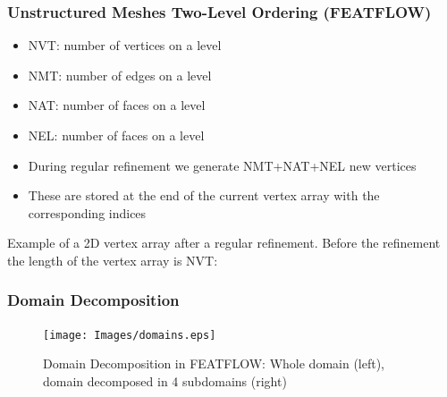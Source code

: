 \begin{frame}[fragile]
\frametitle{Unstructured Meshes Two-Level Ordering (FEATFLOW)}
\begin{itemize}
\item NVT: number of vertices on a level
\item NMT: number of edges on a level
\item NAT: number of faces on a level
\item NEL: number of faces on a level
\item During regular refinement we generate NMT+NAT+NEL new vertices
\item These are stored at the end of the current vertex array with the corresponding indices
\end{itemize}
Example of a 2D vertex array after a regular refinement. Before the refinement the length of the vertex array is NVT:
\end{frame}

\begin{frame}
\frametitle{Domain Decomposition}
\begin{figure}[h!]
\centering
\texttt{[image: Images/domains.eps]}
\caption{Domain Decomposition in FEATFLOW: Whole domain (left), domain decomposed in 4 subdomains (right)}
\label{fig:domains}
\end{figure}
\end{frame}

